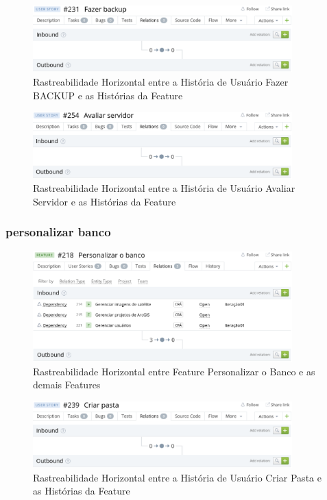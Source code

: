  \begin{figure}[!htb]
    \centering
    \includegraphics[width=10cm, keepaspectratio=false]{figuras/rastreabilidade/horizontal/integridade/historia_backup.eps}
    \caption{Rastreabilidade Horizontal entre a História de Usuário Fazer BACKUP e as Histórias da Feature}
  \end{figure}

  \begin{figure}[!htb]
    \centering
    \includegraphics[width=10cm, keepaspectratio=false]{figuras/rastreabilidade/horizontal/integridade/historia_avaliar_servidor.eps}
    \caption{Rastreabilidade Horizontal entre a História de Usuário Avaliar Servidor e as Histórias da Feature}
  \end{figure}

  \clearpage

\subsubsection{personalizar banco}

  \begin{figure}[!htb]
    \centering
    \includegraphics[width=10cm, keepaspectratio=false]{figuras/rastreabilidade/horizontal/personalizar_banco/feature_personalisar_banco.eps}
    \caption{Rastreabilidade Horizontal entre Feature Personalizar o Banco e as demais Features}
  \end{figure}

  \begin{figure}[!htb]
    \centering
    \includegraphics[width=10cm, keepaspectratio=false]{figuras/rastreabilidade/horizontal/personalizar_banco/historia_pasta.eps}
    \caption{Rastreabilidade Horizontal entre a História de Usuário Criar Pasta e as Histórias da Feature}
  \end{figure}

